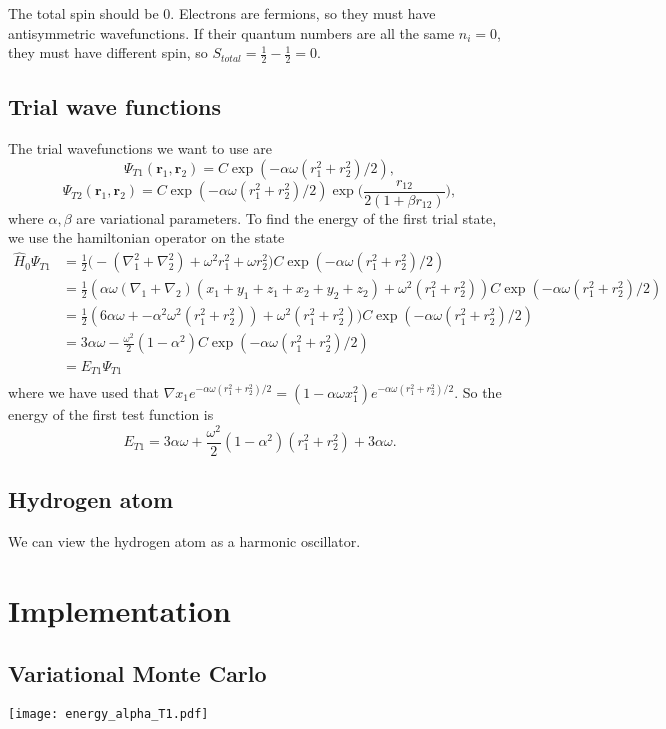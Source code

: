 \documentclass[11pt]{article}
\begin{document}
\begin{flushleft}
The total spin should be $0$. Electrons are fermions, so they must have antisymmetric wavefunctions. If their quantum numbers are all the same $n_i=0$, they must have different spin, so $S_{total} = \frac{1}{2}-\frac{1}{2}=0$.
\end{flushleft}

\pagebreak

\subsection{Trial wave functions}

\begin{flushleft}
The trial wavefunctions we want to use are
\begin{equation}
\Psi_{T1} (\textbf{r}_1, \textbf{r}_2) = C \exp (- \alpha \omega (r_1^2 + r_2^2)/2),
\end{equation}
\begin{equation}
\Psi_{T2}(\textbf{r}_1, \textbf{r}_2) = C \exp (- \alpha \omega (r_1^2+r_2^2)/2) \exp \big( \frac{r_{12}}{2(1+\beta r_{12})} \big),
\end{equation}
where $\alpha, \beta$ are variational parameters. To find the energy of the first trial state, we use the hamiltonian operator on the state
\begin{align*}
\hat{H}_0 \Psi_{T1} &=\frac{1}{2} \big(-(\nabla_1^2 + \nabla_2^2) + \omega^2 r_1^2 + \omega r_2^2 \big) 
C \exp (- \alpha \omega (r_1^2 + r_2^2)/2)\\
&= \frac{1}{2} (\alpha \omega(\nabla_1 + \nabla_2)(x_1 + y_1 + z_1 + x_2 + y_2 + z_2) + \omega^2(r_1^2 + r_2^2))C \exp (- \alpha \omega (r_1^2 + r_2^2)/2)\\
&= \frac{1}{2} (6 \alpha \omega + -\alpha^2 \omega^2 (r_1^2 + r_2^2) ) + \omega^2(r_1^2 + r_2^2))C \exp (- \alpha \omega (r_1^2 + r_2^2)/2)\\
&= 3 \alpha \omega - \frac{\omega^2}{2}(1-\alpha^2) C \exp (- \alpha \omega (r_1^2 + r_2^2)/2)\\
&= E_{T1} \Psi_{T1}\\
\end{align*}
where we have used that $\nabla x_1 e^{- \alpha \omega (r_1^2+r_2^2)/2}= (1 - \alpha \omega x_1^2)e^{- \alpha \omega (r_1^2+r_2^2)/2}$. So the energy of the first test function is 
\begin{equation}
E_{T1} = 3 \alpha \omega + \frac{\omega^2}{2}(1 - \alpha^2)(r_1^2 + r_2^2) + 3 \alpha \omega.
\end{equation}
\end{flushleft}

\subsection{Hydrogen atom}
\begin{flushleft}
We can view the hydrogen atom as a harmonic oscillator.

\end{flushleft}

\section{Implementation}
\subsection{Variational Monte Carlo}


\texttt{[image: energy\_alpha\_T1.pdf]}
\end{document}
